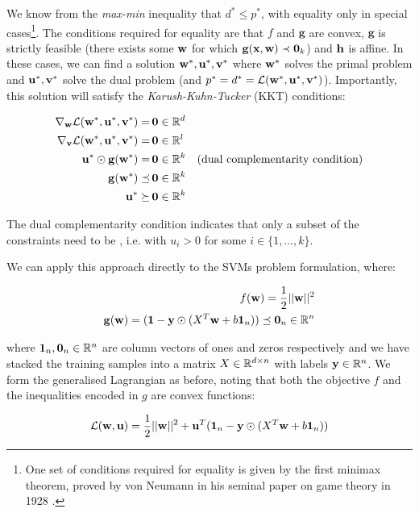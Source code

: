 We know from the \textit{max-min} inequality that $d^* \leq p^*$, with equality only in special cases\footnote{One set of conditions required for equality is given by the first minimax theorem, proved by von Neumann in his seminal paper on game theory in 1928 \cite{neumann1928theorie}.}.  The conditions required for equality are that $f$ and $\mathbf{g}$ are convex, $\mathbf{g}$ is strictly feasible (there exists some $\mathbf{w}$ for which $\mathbf{g}(\mathbf{x}, \mathbf{w}) \prec \mathbf{0}_k$) and $\mathbf{h}$ is affine. In these cases, we can find a solution $\mathbf{w}^*, \mathbf{u}^*, \mathbf{v}^*$ where $\mathbf{w}^*$ solves the primal problem and $\mathbf{u}^*, \mathbf{v}^*$ solve the dual problem (and $p^* = d^* = \mathcal{L}(\mathbf{w}^*, \mathbf{u}^*, \mathbf{v}^*)$).  Importantly, this solution will satisfy the \textit{Karush-Kuhn-Tucker} (KKT) conditions:

\begin{align}
\nabla_{\mathbf{w}} \mathcal{L}(\mathbf{w}^*, \mathbf{u}^*, \mathbf{v}^*) = \, & \mathbf{0} \in \mathbb{R}^d \\
\nabla_{\mathbf{v}} \mathcal{L}(\mathbf{w}^*, \mathbf{u}^*, \mathbf{v}^*) = \, & \mathbf{0} \in \mathbb{R}^l \\
\mathbf{u}^* \odot \mathbf{g}(\mathbf{w}^*) = \, & \mathbf{0} \in \mathbb{R}^k \quad \text{(dual complementarity condition)} \label{eqn:dual-complement}\\
\mathbf{g}(\mathbf{w}^*) \preceq \, & \mathbf{0} \in \mathbb{R}^k \\
\mathbf{u}^* \succeq \, & \mathbf{0} \in \mathbb{R}^k
\end{align}

The dual complementarity condition indicates that only a subset of the constraints need to be , i.e. with $u_i > 0$ for some $i \in \{1, \dots, k\}$.

We can apply this approach directly to the SVMs problem formulation, where:

\begin{align}
f(\mathbf{w}) = \frac{1}{2}||\mathbf{w}||^2 \\
\mathbf{g}(\mathbf{w}) = (\mathbf{1} - \mathbf{y} \odot (X^T\mathbf{w} + b\mathbf{1}_n)) \preceq \mathbf{0}_n \in \mathbb{R}^{n}
\end{align}

where $\mathbf{1}_n, \mathbf{0}_n \in \mathbb{R}^n$ are column vectors of ones and zeros respectively and we have stacked the training samples into a matrix $X \in \mathbb{R}^{d \times n}$ with labels $\mathbf{y} \in \mathbb{R}^{n}$.  We form the generalised Lagrangian as before, noting that both the objective $f$ and the inequalities encoded in $g$ are convex functions:

\begin{align}
\mathcal{L}(\mathbf{w}, \mathbf{u}) = \frac{1}{2}||\mathbf{w}||^2 + \mathbf{u}^T(\mathbf{1}_n - \mathbf{y} \odot (X^T\mathbf{w} + b\mathbf{1}_n)) \label{eqn:generalised-lagrangian}
\end{align}

